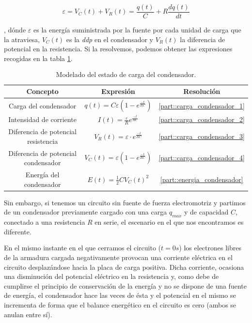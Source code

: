 \documentclass[../main.tex]{subfiles}
\begin{document}
\begin{equation}
    \varepsilon = V_C(t) + V_R(t) = \frac{q(t)}{C} + R\frac{d q(t)}{d t}
    \label{eqq::balance_energetico_rc_1}
\end{equation}


, dónde $\varepsilon$ es la energía suministrada por la fuente por cada unidad de carga que la atraviesa, $V_C(t)$ es la \textit{ddp} en el condensador y $V_R(t)$ la diferencia de potencial en la resistencia. Si la resolvemos, podemos obtener las expresiones recogidas en la tabla \ref{tab::ecuaciones_carga_rc}.\\


\begin{table}[!ht]
    \begin{center}
        \begin{tabular}{|| c | c | c ||}
            \hline
            \textbf{Concepto} & \textbf{Expresión} &  \textbf{Resolución}\\ \hline
            Carga del condensador & $q(t) = C\varepsilon \left( 1 - e^{\frac{-t}{RC}} \right)$ & \ref{part::carga_condensador_1} \\
            Intensidad de corriente & $I(t) = \frac{\varepsilon}{R}e^{\frac{-t}{RC}}$ & \ref{part::carga_condensador_2} \\
            Diferencia de potencial resistencia & $V_R(t) = \varepsilon \cdot e^{\frac{-t}{RC}}$ & \ref{part::carga_condensador_3} \\ 
            Diferencia de potencial condensador & $V_C(t) = \varepsilon \left(1- e^{\frac{-t}{RC}}\right)$ & \ref{part::carga_condensador_4} \\ 
            Energía del condensador & $E(t) = \frac{1}{2}CV_C(t)^2 $ & \ref{part::energia_condensador}
            \\
            \hline
            \end{tabular}
            \caption{Modelado del estado de carga del condensador.}
            \label{tab::ecuaciones_carga_rc}
    \end{center}
\end{table}

Sin embargo, si tenemos un circuito sin fuente de fuerza electromotriz y partimos de un condensador previamente cargado con una carga $q_{max}$ y de capacidad $C$, conectado a una resistencia $R$ en serie, el escenario en el que nos encontramos es diferente. 

En el mismo instante en el que cerramos el circuito ($t=0s$) los electrones libres de la armadura cargada negativamente provocan una corriente eléctrica en el circuito desplazándose hacia la placa de carga positiva. Dicha corriente, ocasiona una disminución del potencial eléctrico en la resistencia y, como debe de cumplirse el principio de conservación de la energía y no se dispone de una fuente de energía, el condensador hace las veces de ésta y el potencial en el mismo se incrementa de forma que el balance energético en el circuito es cero (ambos se anulan entre sí). \\
\end{document}
